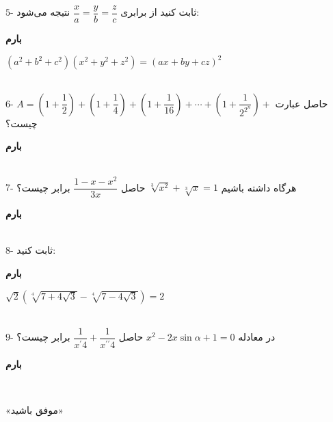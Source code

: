 \documentclass[a4paper,14pt]{article}
\begin{document}
\noindent\makebox[\textwidth]{\rule{19cm}{1pt}}
\\
$5$-
ثابت کنید از برابری 
$\dfrac{x}{a}=\dfrac{y}{b}=\dfrac{z}{c}$
نتیجه می‌شود:
\vspace*{-1.3cm}
\begin{flushleft}
\textbf{بارم}
\end{flushleft}
\begin{flushleft}
$\left(a^{2}+b^{2}+c^{2} \right)\left(x^{2}+y^{2}+z^{2} \right)=(ax+by+cz)^{2}  $
\end{flushleft}
\noindent\makebox[\textwidth]{\rule{19cm}{1pt}}
\\
$6$-
حاصل عبارت 
$A=\left(1+\dfrac{1}{2} \right)+\left(1+\dfrac{1}{4} \right)+\left(1+\dfrac{1}{16} \right)+\cdots+\left(1+\dfrac{1}{2^{2^{n}}} \right)+ $ 
چیست؟
\vspace*{-1.3cm}
\begin{flushleft}
\textbf{بارم}
\end{flushleft}
\noindent\makebox[\textwidth]{\rule{19cm}{1pt}}
\\
$7$-
هرگاه داشته باشیم 
$\sqrt[3]{x^{2}}+\sqrt[3]{x}=1$
حاصل 
$\dfrac{1-x-x^{2}}{3x}$
برابر چیست؟
\vspace*{-1.3cm}
\begin{flushleft}
\textbf{بارم}
\end{flushleft}
\noindent\makebox[\textwidth]{\rule{19cm}{1pt}}
\\
$8$-
ثابت کنید:
\vspace*{-1.3cm}
\begin{flushleft}
\textbf{بارم}
\end{flushleft}
\begin{center}
$\sqrt{2}\left(\sqrt[4]{7+4\sqrt{3}}-\sqrt[4]{7-4\sqrt{3}} \right)=2 $
\end{center}
\noindent\makebox[\textwidth]{\rule{19cm}{1pt}}
\\
$9$-
در معادله 
$x^{2}-2x\sin\alpha+1=0$
حاصل 
$\dfrac{1}{x^{\prime}4}+\dfrac{1}{x^{\prime\prime}4}$
برابر چیست؟
\vspace*{-1.3cm}
\begin{flushleft}
\textbf{بارم}
\end{flushleft}
\noindent\makebox[\textwidth]{\rule{19cm}{1pt}}
\\
\begin{center}
«موفق باشید»
\end{center}
\end{document}
